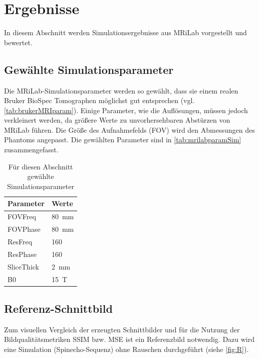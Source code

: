 \chapter{Ergebnisse}
\label{chap:ergb}
In diesem Abschnitt werden Simulationsergebnisse aus MRiLab vorgestellt und bewertet.

\section{Gewählte Simulationsparameter}
Die MRiLab-Simulationsparameter werden so gewählt, dass sie einem realen Bruker BioSpec Tomographen möglichst gut entsprechen (vgl. \autoref{tab:brukerMRIparam}). Einige Parameter, wie die Auflösungen, müssen jedoch verkleinert werden, da größere Werte zu unvorhersehbaren Abstürzen von MRiLab führen. Die Größe des Aufnahmefelds (FOV) wird den Abmessungen des Phantoms angepasst. Die gewählten Parameter sind in \autoref{tab:mrilabparamSim} zusammengefasst.

\begin{table}[H]
	\centering
	\caption[gewählte Simulationsparameter]{Für diesen Abschnitt gewählte Simulationsparameter}
	\label{tab:mrilabparamSim}
	\begin{tabularx}{0.3\textwidth}{lX}
		\toprule
		\textbf{Parameter} & \textbf{Werte}\\
		\midrule
		FOVFreq    & \SI{80}{\mm}\\
		FOVPhase   & \SI{80}{\mm}\\
		ResFreq    & 160\\
		ResPhase   & 160\\
		SliceThick & \SI{2}{\mm}\\
		B0         & \SI{15}{\tesla} \\
		\bottomrule
		\end{tabularx}
\end{table}

\clearpage
\section{Referenz-Schnittbild}
Zum visuellen Vergleich der erzeugten Schnittbilder und für die Nutzung der Bildqualitätsmetriken SSIM bzw. MSE ist ein Referenzbild notwendig. Dazu wird eine Simulation (Spinecho-Sequenz) ohne Rauschen durchgeführt (siehe \autoref{fig:R}).

